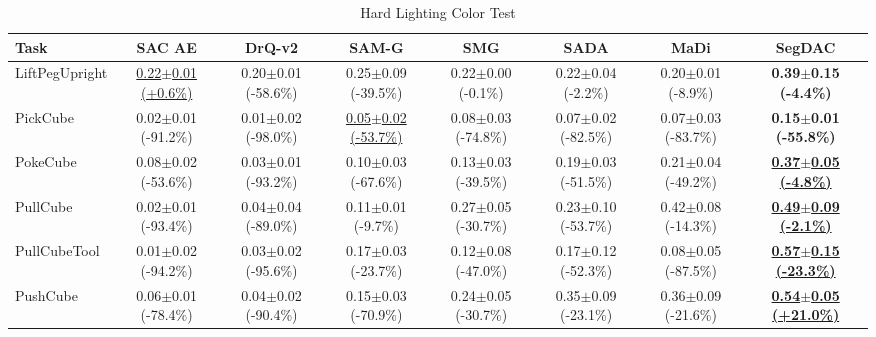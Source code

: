 \begin{table}[htbp]
\centering
\scriptsize
\caption{Hard Lighting Color Test}
\label{tab:appendix_lightingcolortest_hard}
\begin{adjustbox}{max width=\textwidth}
\begin{tabular}{l*{7}{c}}
\toprule
\textbf{Task} & \textbf{SAC AE} & \textbf{DrQ-v2} & \textbf{SAM-G} & \textbf{SMG} & \textbf{SADA} & \textbf{MaDi} & \textbf{SegDAC} \\
\midrule
LiftPegUpright & \underline{0.22$\pm$0.01 \scriptsize{(+0.6\%)}} & 0.20$\pm$0.01 \scriptsize{(-58.6\%)} & 0.25$\pm$0.09 \scriptsize{(-39.5\%)} & 0.22$\pm$0.00 \scriptsize{(-0.1\%)} & 0.22$\pm$0.04 \scriptsize{(-2.2\%)} & 0.20$\pm$0.01 \scriptsize{(-8.9\%)} & \textbf{0.39$\pm$0.15 \scriptsize{(-4.4\%)}} \\
PickCube & 0.02$\pm$0.01 \scriptsize{(-91.2\%)} & 0.01$\pm$0.02 \scriptsize{(-98.0\%)} & \underline{0.05$\pm$0.02 \scriptsize{(-53.7\%)}} & 0.08$\pm$0.03 \scriptsize{(-74.8\%)} & 0.07$\pm$0.02 \scriptsize{(-82.5\%)} & 0.07$\pm$0.03 \scriptsize{(-83.7\%)} & \textbf{0.15$\pm$0.01 \scriptsize{(-55.8\%)}} \\
PokeCube & 0.08$\pm$0.02 \scriptsize{(-53.6\%)} & 0.03$\pm$0.01 \scriptsize{(-93.2\%)} & 0.10$\pm$0.03 \scriptsize{(-67.6\%)} & 0.13$\pm$0.03 \scriptsize{(-39.5\%)} & 0.19$\pm$0.03 \scriptsize{(-51.5\%)} & 0.21$\pm$0.04 \scriptsize{(-49.2\%)} & \textbf{\underline{0.37$\pm$0.05 \scriptsize{(-4.8\%)}}} \\
PullCube & 0.02$\pm$0.01 \scriptsize{(-93.4\%)} & 0.04$\pm$0.04 \scriptsize{(-89.0\%)} & 0.11$\pm$0.01 \scriptsize{(-9.7\%)} & 0.27$\pm$0.05 \scriptsize{(-30.7\%)} & 0.23$\pm$0.10 \scriptsize{(-53.7\%)} & 0.42$\pm$0.08 \scriptsize{(-14.3\%)} & \textbf{\underline{0.49$\pm$0.09 \scriptsize{(-2.1\%)}}} \\
PullCubeTool & 0.01$\pm$0.02 \scriptsize{(-94.2\%)} & 0.03$\pm$0.02 \scriptsize{(-95.6\%)} & 0.17$\pm$0.03 \scriptsize{(-23.7\%)} & 0.12$\pm$0.08 \scriptsize{(-47.0\%)} & 0.17$\pm$0.12 \scriptsize{(-52.3\%)} & 0.08$\pm$0.05 \scriptsize{(-87.5\%)} & \textbf{\underline{0.57$\pm$0.15 \scriptsize{(-23.3\%)}}} \\
PushCube & 0.06$\pm$0.01 \scriptsize{(-78.4\%)} & 0.04$\pm$0.02 \scriptsize{(-90.4\%)} & 0.15$\pm$0.03 \scriptsize{(-70.9\%)} & 0.24$\pm$0.05 \scriptsize{(-30.7\%)} & 0.35$\pm$0.09 \scriptsize{(-23.1\%)} & 0.36$\pm$0.09 \scriptsize{(-21.6\%)} & \textbf{\underline{0.54$\pm$0.05 \scriptsize{(+21.0\%)}}} \\

\end{tabular}
\end{adjustbox}
\end{table}
